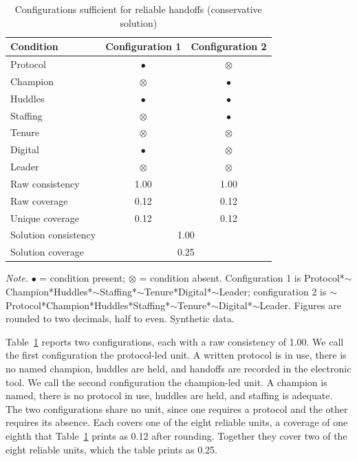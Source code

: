 \documentclass[12pt]{article}
\begin{document}
\begin{table}[htbp]
\centering
\caption{Configurations sufficient for reliable handoffs (conservative solution)}
\label{tab:fit}
\begin{tabular}{lcc}
\toprule
Condition & Configuration 1 & Configuration 2 \\
\midrule
Protocol & $\bullet$ & $\otimes$ \\
Champion & $\otimes$ & $\bullet$ \\
Huddles & $\bullet$ & $\bullet$ \\
Staffing & $\otimes$ & $\bullet$ \\
Tenure & $\otimes$ & $\otimes$ \\
Digital & $\bullet$ & $\otimes$ \\
Leader & $\otimes$ & $\otimes$ \\
\midrule
Raw consistency & 1.00 & 1.00 \\
Raw coverage & 0.12 & 0.12 \\
Unique coverage & 0.12 & 0.12 \\
\midrule
Solution consistency & \multicolumn{2}{c}{1.00} \\
Solution coverage & \multicolumn{2}{c}{0.25} \\
\bottomrule
\end{tabular}

\medskip
\begin{minipage}{0.9\textwidth}
\footnotesize\raggedright\textit{Note.} $\bullet$ = condition present; $\otimes$ = condition absent. Configuration 1 is Protocol*$\sim$Champion*Huddles*$\sim$Staffing*$\sim$Tenure*Digital*$\sim$Leader; configuration 2 is $\sim$Protocol*Champion*Huddles*Staffing*$\sim$Tenure*$\sim$Digital*$\sim$Leader. Figures are rounded to two decimals, half to even. Synthetic data.
\end{minipage}
\end{table}

Table~\ref{tab:fit} reports two configurations, each with a raw consistency of 1.00. We call the first configuration the protocol-led unit. A written protocol is in use, there is no named champion, huddles are held, and handoffs are recorded in the electronic tool. We call the second configuration the champion-led unit. A champion is named, there is no protocol in use, huddles are held, and staffing is adequate. The two configurations share no unit, since one requires a protocol and the other requires its absence. Each covers one of the eight reliable units, a coverage of one eighth that Table~\ref{tab:fit} prints as 0.12 after rounding. Together they cover two of the eight reliable units, which the table prints as 0.25.
\end{document}
